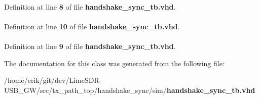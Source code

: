 \paragraph[{ieee}]{\hspace{0.3cm}{\ttfamily [Library]}}\label{classhandshake__sync__tb_a0a6af6eef40212dbaf130d57ce711256}


Definition at line {\bf 8} of file {\bf handshake\+\_\+sync\+\_\+tb.\+vhd}.

\paragraph[{numeric\+\_\+std}]{\hspace{0.3cm}{\ttfamily [Package]}}\label{classhandshake__sync__tb_a2edc34402b573437d5f25fa90ba4013e}


Definition at line {\bf 10} of file {\bf handshake\+\_\+sync\+\_\+tb.\+vhd}.

\paragraph[{std\+\_\+logic\+\_\+1164}]{\hspace{0.3cm}{\ttfamily [Package]}}\label{classhandshake__sync__tb_acd03516902501cd1c7296a98e22c6fcb}


Definition at line {\bf 9} of file {\bf handshake\+\_\+sync\+\_\+tb.\+vhd}.



The documentation for this class was generated from the following file\+:\begin{DoxyCompactItemize}
\item 
/home/erik/git/dev/\+Lime\+S\+D\+R-\/\+U\+S\+B\+\_\+\+G\+W/src/tx\+\_\+path\+\_\+top/handshake\+\_\+sync/sim/{\bf handshake\+\_\+sync\+\_\+tb.\+vhd}\end{DoxyCompactItemize}
